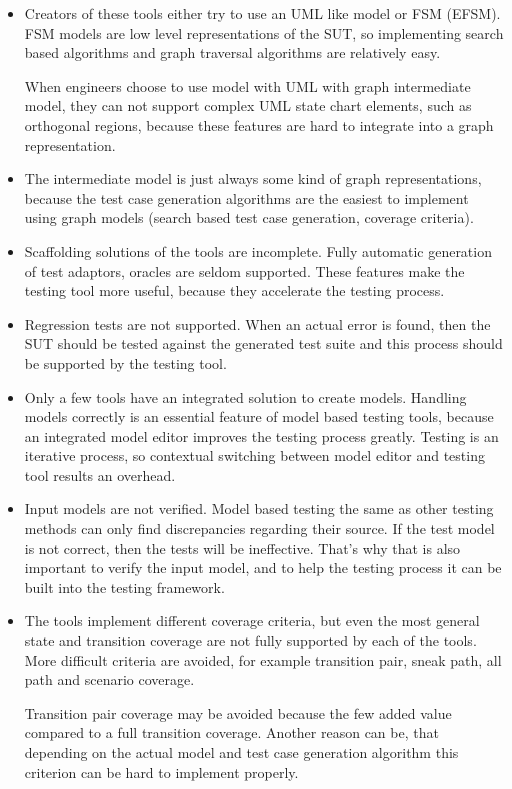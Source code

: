 \begin{itemize}
	\item Creators of these tools either try to use an UML like model or FSM (EFSM). FSM models are low level representations of the SUT, so implementing search based algorithms and graph traversal algorithms are relatively easy.
	
	When engineers choose to use model with UML with graph intermediate model, they can not support complex UML state chart elements, such as orthogonal regions, because these features are hard to integrate into a graph representation.
	\item The intermediate model is just always some kind of graph representations, because the test case generation algorithms are the easiest to implement using graph models (search based test case generation, coverage criteria).
	\item Scaffolding solutions of the tools are incomplete. Fully automatic generation of test adaptors, oracles are seldom supported. These features make the testing tool more useful, because they accelerate the testing process.
	\item Regression tests are not supported. When an actual error is found, then the SUT should be tested against the generated test suite and this process should be supported by the testing tool.
	\item Only a few tools have an integrated solution to create models. Handling models correctly is an essential feature of model based testing tools, because an integrated model editor improves the testing process greatly. Testing is an iterative process, so contextual switching between model editor and testing tool results an overhead.
	\item Input models are not verified. Model based testing the same as other testing methods can only find discrepancies regarding their source. If the test model is not correct, then the tests will be ineffective. That's why that is also important to verify the input model, and to help the testing process it can be built into the testing framework.
	\item The tools implement different coverage criteria, but even the most general state and transition coverage are not fully supported by each of the tools. More difficult criteria are avoided, for example transition pair, sneak path, all path and scenario coverage.
	
	Transition pair coverage may be avoided because the few added value compared to a full transition coverage. Another reason can be, that depending on the actual model and test case generation algorithm this criterion can be hard to implement properly.
	

\end{itemize}
